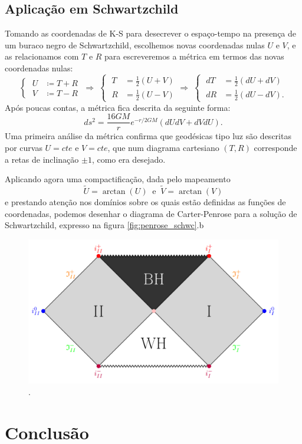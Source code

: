 \documentclass[12pt, a4paper]{article}
\theoremstyle{meuremarkstyle}
\theoremstyle{definicao}
\begin{document}
\subsection{Aplicação em Schwartzchild}
Tomando as coordenadas de K-S para desecrever o espaço-tempo na presença de um buraco negro de Schwartzchild, escolhemos novas coordenadas nulas $U$ e $V$, e as relacionamos com $T$ e $R$ para escreveremos a métrica em termos das novas coordenadas nulas:
\[
\left\{\;
\begin{aligned}
    U &\coloneq T + R\\
    V &\coloneq T - R
  \end{aligned}
\right. \;\Rightarrow \; \left\{\;
\begin{aligned}
    T &= \frac{1}{2}(U+V)\\[0.75em]
    R &= \frac{1}{2}(U-V)
  \end{aligned}
\right. \Rightarrow \; \left\{\;
\begin{aligned}
    dT &= \frac{1}{2}(dU+dV)\\[0.75em]
    dR &= \frac{1}{2}(dU-dV).
  \end{aligned}
\right.
\]
Após poucas contas, a métrica fica descrita da seguinte forma:
\[ ds^2 = \frac{16GM}{r}e^{-r/2GM}(dUdV + dVdU).\]
Uma primeira análise da métrica confirma que geodésicas tipo luz são descritas por curvas $U=cte$ e $V=cte$, que num diagrama cartesiano $(T,R)$ corresponde a retas de inclinação $\pm 1$, como era desejado.

Aplicando agora uma compactificação, dada pelo mapeamento
\[ \tilde{U} = \arctan(U) \;\; \text{e} \;\; \tilde{V} = \arctan(V) \]
e prestando atenção nos domínios sobre os quais estão definidas as funções de coordenadas, podemos desenhar o diagrama de Carter-Penrose para a solução de Schwartzchild, expresso na figura \ref{fig:penrose_schwc}.b

\begin{figure}[h!]
    \centering
    \includegraphics[width=1\linewidth]{Figuras/penrose_schwc.png}
    \caption{.}
    \label{fig:Minkowski_errada}
\end{figure}

\section{Conclusão}





\newpage
\nocite{*}
\printbibliography[title={Referências}]
\end{document}
